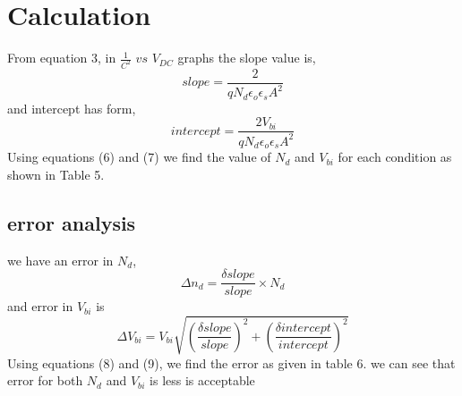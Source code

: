 \section{Calculation}
	From equation 3, in $\frac{1}{C^2}$ $vs$ $V_{DC}$ graphs the slope value is,
\begin{equation}
     slope=\frac{2}{q N_d \epsilon_o \epsilon_s A^2}
\end{equation}
and intercept has form,
\begin{equation}
   intercept=\frac{2 V_{bi}}{q N_d \epsilon_o \epsilon_s A^2}
\end{equation}
    Using equations (6) and (7) we find the value of $N_d$ and $V_{bi}$ for each condition as shown in Table 5.
    
\subsection{error analysis}
we have an error in $N_d$,
\begin{equation}
    \Delta n_d=\frac{\delta slope}{slope}\times N_d
\end{equation}
and error in $V_{bi}$ is
\begin{equation}
    \Delta V_{bi}=V_{bi}\sqrt{\left(\frac{\delta slope}{slope}\right)^2 + \left(\frac{\delta intercept}{intercept}\right)^2}
\end{equation}
    Using equations (8) and (9), we find the error as given in table 6.  we can see that error for both $N_d$ and $V_{bi}$ is less is acceptable
    
   
    

    
 